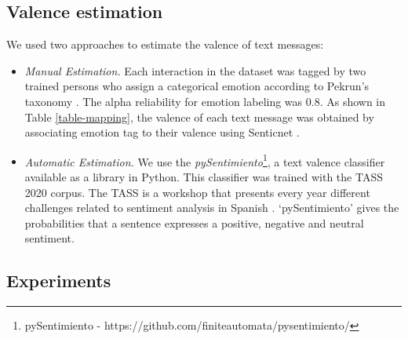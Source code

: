 \documentclass[3p,times,preprint]{elsarticle}
\begin{document}
\subsection{Valence estimation} 
We used two approaches to estimate the valence  of text messages: 
\begin{itemize}
    \item  \textit{Manual Estimation.} Each interaction in the dataset was tagged by two trained persons who assign a categorical emotion according to Pekrun's taxonomy \citep{Pekrun2014}. The alpha reliability for emotion labeling was 0.8. As shown in Table \ref{table-mapping}, the valence of each text message was obtained by associating emotion tag to their valence using Senticnet \citep{cambria2010senticnet}.
    
    \item \textit{Automatic Estimation.}  We use the \textit{pySentimiento}\footnote{pySentimiento - https://github.com/finiteautomata/pysentimiento/}, a text valence classifier available as a library in Python. This classifier was trained with the TASS 2020 corpus. The TASS is a workshop that presents every year different challenges related to sentiment analysis in Spanish \citep{Luque2018, MartinezCamara2018}. `pySentimiento' gives the probabilities that a sentence expresses a positive, negative and neutral sentiment. 
\end{itemize}


\subsection {Experiments} 
\end{document}
